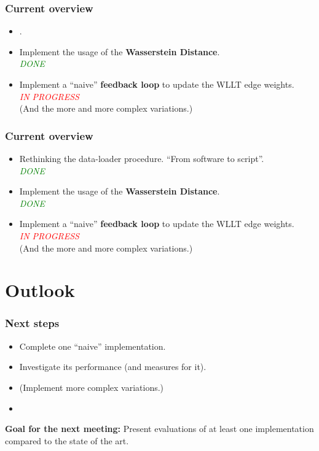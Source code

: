 \begin{frame}
	\frametitle{Current overview}
	\begin{itemize}
		\item[] . \newline
		\item Implement the usage of the \textbf{Wasserstein Distance}.\\
		\textcolor{green}{\textit{DONE}}
		\item Implement a \enquote{naive} \textbf{feedback loop} to update the WLLT edge weights.\\
		\textcolor{red}{\textit{IN PROGRESS}}\\
		(And the more and more complex variations.)
	\end{itemize}	
\end{frame}

\begin{frame}
	\frametitle{Current overview}	
	\begin{itemize}
		\item Rethinking the data-loader procedure. \enquote{From software to script}.\\
		\textcolor{green}{\textit{DONE}}
		\item Implement the usage of the \textbf{Wasserstein Distance}.\\
		\textcolor{green}{\textit{DONE}}
		\item Implement a \enquote{naive} \textbf{feedback loop} to update the WLLT edge weights.\\
		\textcolor{red}{\textit{IN PROGRESS}}\\
		(And the more and more complex variations.)
	\end{itemize}	
\end{frame}

\section{Outlook}

\begin{frame}
	\frametitle{Next steps}
	\begin{itemize}
		\item Complete one \enquote{naive} implementation.
		\item Investigate its performance (and measures for it).
		\item (Implement more complex variations.)
		\item[] 
	\end{itemize}	
	\textbf{Goal for the next meeting:} Present evaluations of at least one implementation compared to the state of the art.
\end{frame}

